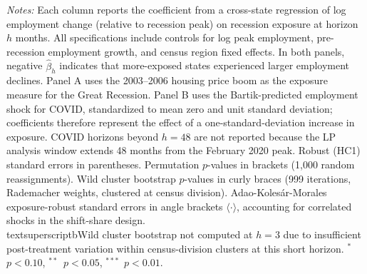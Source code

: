 \begin{table}[H]
\begin{threeparttable}
\begin{tablenotes}[flushleft]
\item \textit{Notes:} Each column reports the coefficient from a cross-state regression of log employment change (relative to recession peak) on recession exposure at horizon $h$ months. All specifications include controls for log peak employment, pre-recession employment growth, and census region fixed effects. In both panels, negative $\hat{\beta}_h$ indicates that more-exposed states experienced larger employment declines. Panel A uses the 2003--2006 housing price boom as the exposure measure for the Great Recession. Panel B uses the Bartik-predicted employment shock for COVID, standardized to mean zero and unit standard deviation; coefficients therefore represent the effect of a one-standard-deviation increase in exposure. COVID horizons beyond $h=48$ are not reported because the LP analysis window extends 48 months from the February 2020 peak. Robust (HC1) standard errors in parentheses. Permutation $p$-values in brackets (1,000 random reassignments). Wild cluster bootstrap $p$-values in curly braces (999 iterations, Rademacher weights, clustered at census division). Adao-Koles\'{a}r-Morales exposure-robust standard errors in angle brackets $\langle\cdot\rangle$, accounting for correlated shocks in the shift-share design. \\textsuperscript{b}Wild cluster bootstrap not computed at $h=3$ due to insufficient post-treatment variation within census-division clusters at this short horizon. $^{*}$~$p<0.10$, $^{**}$~$p<0.05$, $^{***}$~$p<0.01$.
\end{tablenotes}
\end{threeparttable}
\label{tab:main}
\end{table}
